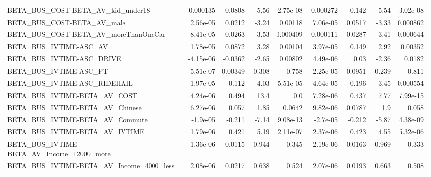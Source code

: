 \begin{tabular}{lrrrrrrrr}
BETA\_BUS\_COST-BETA\_AV\_kid\_under18                  &   -0.000135 &      -0.0808 &     -5.56 & 2.75e-08 &  -0.000272 &      -0.142 &        -5.54 &      3.02e-08 \\
BETA\_BUS\_COST-BETA\_AV\_male                         &    2.56e-05 &       0.0212 &     -3.24 &  0.00118 &   7.06e-05 &      0.0517 &        -3.33 &      0.000862 \\
BETA\_BUS\_COST-BETA\_AV\_moreThanOneCar               &   -8.41e-05 &      -0.0263 &     -3.53 & 0.000409 &  -0.000111 &     -0.0287 &        -3.41 &      0.000644 \\
BETA\_BUS\_IVTIME-ASC\_AV                             &    1.78e-05 &       0.0872 &      3.28 &  0.00104 &   3.97e-05 &       0.149 &         2.92 &       0.00352 \\
BETA\_BUS\_IVTIME-ASC\_DRIVE                          &   -4.15e-06 &      -0.0362 &     -2.65 &  0.00802 &   4.49e-06 &        0.03 &        -2.36 &        0.0182 \\
BETA\_BUS\_IVTIME-ASC\_PT                             &    5.51e-07 &      0.00349 &     0.308 &    0.758 &   2.25e-05 &      0.0951 &        0.239 &         0.811 \\
BETA\_BUS\_IVTIME-ASC\_RIDEHAIL                       &    1.97e-05 &        0.112 &      4.03 & 5.51e-05 &   4.64e-05 &       0.196 &         3.45 &      0.000554 \\
BETA\_BUS\_IVTIME-BETA\_AV\_COST                       &    4.24e-06 &        0.494 &      13.4 &      0.0 &   7.28e-06 &       0.437 &         7.77 &      7.99e-15 \\
BETA\_BUS\_IVTIME-BETA\_AV\_Chinese                    &    6.27e-06 &        0.057 &      1.85 &   0.0642 &   9.82e-06 &      0.0787 &          1.9 &         0.058 \\
BETA\_BUS\_IVTIME-BETA\_AV\_Commute                    &    -1.9e-05 &       -0.211 &     -7.14 & 9.08e-13 &   -2.7e-05 &      -0.212 &        -5.87 &      4.38e-09 \\
BETA\_BUS\_IVTIME-BETA\_AV\_IVTIME                     &    1.79e-06 &        0.421 &      5.19 & 2.11e-07 &   2.37e-06 &       0.423 &         4.55 &      5.32e-06 \\
BETA\_BUS\_IVTIME-BETA\_AV\_Income\_12000\_more          &   -1.36e-06 &      -0.0115 &    -0.944 &    0.345 &   2.19e-06 &      0.0163 &       -0.969 &         0.333 \\
BETA\_BUS\_IVTIME-BETA\_AV\_Income\_4000\_less           &    2.08e-06 &       0.0217 &     0.638 &    0.524 &   2.07e-06 &      0.0193 &        0.663 &         0.508 \\

\end{tabular}
